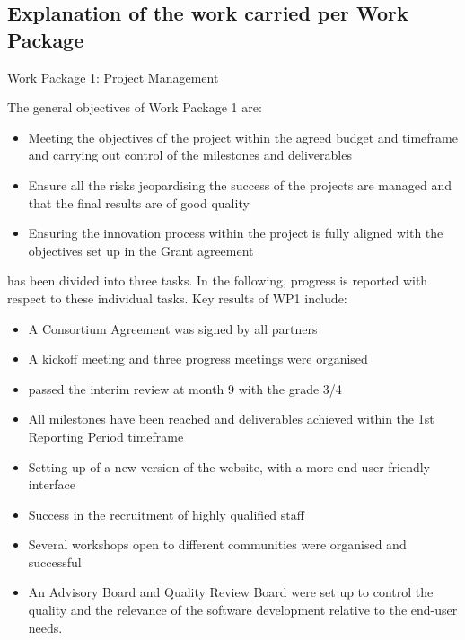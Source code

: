 \documentclass{deliverablereport}
\makeatletter
\renewcommand\subsubsection{\@startsection{subsubsection}{2}%
  \z@{.5\linespacing\@plus.7\linespacing}{.1\linespacing}%
  {\normalfont\bfseries}}
\makeatother
\begin{document}
\subsection{Explanation of the work carried per Work Package}
\subsubsection{Work Package 1: Project Management}


The general objectives of Work Package 1 are:

\begin{itemize}
\item{Meeting the objectives of the project within the agreed budget and timeframe and carrying out control of the milestones and deliverables}
\item{Ensure all the risks jeopardising the success of the projects are managed and that the final results are of good quality}
\item{Ensuring the innovation process within the project is fully aligned with the objectives set up in the Grant agreement}
\end{itemize}

 has been divided into three tasks. In the following, progress is reported with respect to these individual tasks.
Key results of WP1 include:

\begin{itemize}
\item{A Consortium Agreement was signed by all partners}
\item{A kickoff meeting and three progress meetings were organised}
\item{\ODK passed the interim review at month 9 with the grade 3/4}
\item{All milestones have been reached and deliverables achieved within the 1st Reporting Period timeframe}
\item{Setting up of a new version of the \ODK website, with a more end-user friendly interface}
\item{Success in the recruitment of highly qualified staff}
\item{Several workshops open to different communities were organised and successful}
\item{An Advisory Board and Quality Review Board were set up to control the quality and the relevance of the software development relative to the end-user needs.}
\end{itemize}
\end{document}
